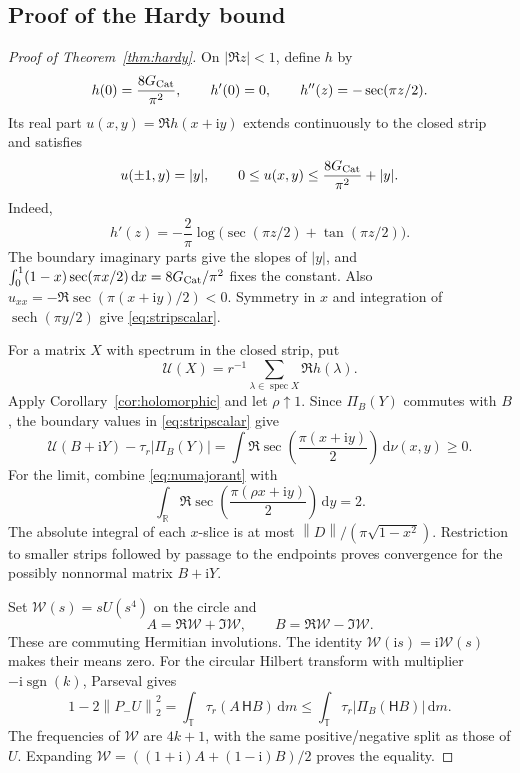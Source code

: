 \documentclass[11pt]{amsart}
\theoremstyle{remark}
\theoremstyle{plain}
\numberwithin{equation}{section}
\DeclareMathOperator{\spec}{spec}
\DeclareMathOperator{\sech}{sech}
\newcommand{\R}{\mathbb R}
\newcommand{\ii}{\mathrm i}
\newcommand{\dd}{\,\mathrm d}
\newcommand{\norm}[1]{\left\|#1\right\|}
\newcommand{\Gc}{G_{\rm Cat}}
\newcommand{\Hilb}{\mathsf H}
\begin{document}
\subsection{Proof of the Hardy bound}

\begin{proof}[Proof of Theorem~\ref{thm:hardy}]
On \(|\Re z|<1\), define \(h\) by
\[
 h(0)=\frac{8\Gc}{\pi^2},\qquad h'(0)=0,\qquad
 h''(z)=-\sec(\pi z/2).
\]
Its real part \(u(x,y)=\Re h(x+\ii y)\) extends continuously to the
closed strip and satisfies
\begin{equation}\label{eq:stripscalar}
 u(\pm1,y)=|y|,\qquad
 0\le u(x,y)\le\frac{8\Gc}{\pi^2}+|y|.
\end{equation}
Indeed,
\[
 h'(z)=-\frac2\pi
 \log\bigl(\sec(\pi z/2)+\tan(\pi z/2)\bigr).
\]
The boundary imaginary parts give the slopes of \(|y|\), and
\(\int_0^1(1-x)\sec(\pi x/2)\dd x=8\Gc/\pi^2\) fixes the constant.
Also \(u_{xx}=-\Re\sec(\pi(x+\ii y)/2)<0\).
Symmetry in \(x\) and integration of \(\sech(\pi y/2)\) give
\eqref{eq:stripscalar}.

For a matrix \(X\) with spectrum in the closed strip, put
\[
 \mathscr U(X)=r^{-1}\sum_{\lambda\in\spec X}\Re h(\lambda).
\]
Apply Corollary~\ref{cor:holomorphic} and let \(\rho\uparrow1\).
Since \(\Pi_B(Y)\) commutes with \(B\), the boundary values in
\eqref{eq:stripscalar} give
\begin{equation}\label{eq:stripmatrix}
 \mathscr U(B+\ii Y)-\tau_r|\Pi_B(Y)|
 =
 \int\Re\sec\!\left(\frac{\pi(x+\ii y)}2\right)\dd\nu(x,y)
 \ge0.
\end{equation}
For the limit, combine \eqref{eq:numajorant} with
\[
 \int_\R\Re\sec\!\left(\frac{\pi(\rho x+\ii y)}2\right)\dd y=2.
\]
The absolute integral of each \(x\)-slice is at most
\(\norm D/(\pi\sqrt{1-x^2})\).
Restriction to smaller strips followed by passage to the endpoints
proves convergence for the possibly nonnormal matrix \(B+\ii Y\).

Set \(\mathcal W(s)=sU(s^4)\) on the circle and
\[
 A=\Re\mathcal W+\Im\mathcal W,\qquad
 B=\Re\mathcal W-\Im\mathcal W.
\]
These are commuting Hermitian involutions.
The identity \(\mathcal W(\ii s)=\ii\mathcal W(s)\) makes their means
zero. For the circular Hilbert transform with multiplier
\(-\ii\operatorname{sgn}(k)\), Parseval gives
\begin{equation}\label{eq:HardyParseval}
 1-2\norm{P_-U}_2^2
 =\int_{\mathbb T}\tau_r(A\,\Hilb B)\dd m
 \le\int_{\mathbb T}\tau_r|\Pi_B(\Hilb B)|\dd m.
\end{equation}
The frequencies of \(\mathcal W\) are \(4k+1\), with the same
positive/negative split as those of \(U\). Expanding
\(\mathcal W=((1+\ii)A+(1-\ii)B)/2\) proves the equality.


\end{proof}
\end{document}
